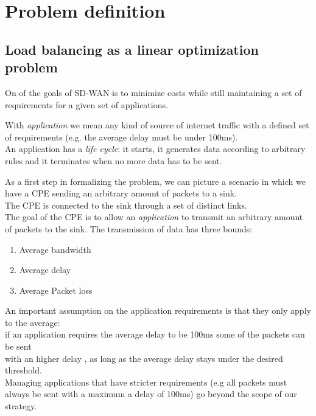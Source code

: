 
\section{Problem definition}

\subsection{Load balancing as a linear optimization problem}

On of the goals of SD-WAN is to minimize costs while still maintaining a set of requirements for a given set of applications. 


\begin{mdframed}[hidealllines=true,backgroundcolor=blue!20]
	With \textit{application} we mean any kind of source of internet traffic with a defined set of requirements (e.g. the average delay must be under 100ms). \\
	An application has a \textit{life cycle}: it starts, it generates data according to arbitrary rules and it terminates when no more data has to be sent. 
\end{mdframed} 


As a first step in formalizing the problem,  we can picture a scenario in which we have a CPE sending an arbitrary amount of packets to a sink. \\

The CPE is connected to the sink through a set of distinct links. \\

The goal of the CPE is to allow an \textit{application} to  transmit an arbitrary amount of packets to the sink. The transmission of data has three bounds:

\begin{enumerate}
	\item Average bandwidth
	\item Average delay
	\item Average Packet loss
\end{enumerate}


\begin{mdframed}[hidealllines=true,backgroundcolor=blue!20]
	An important assumption on the application requirements is that they only apply to the average: \\ if an application requires the average delay to be 100ms some of the packets can be sent \\ with an higher delay , as long as the average delay stays under the desired threshold. \\
	Managing applications that have stricter requirements (e.g all packets must always be sent with a maximum a delay of 100ms) go beyond the scope of our strategy.
\end{mdframed} 




